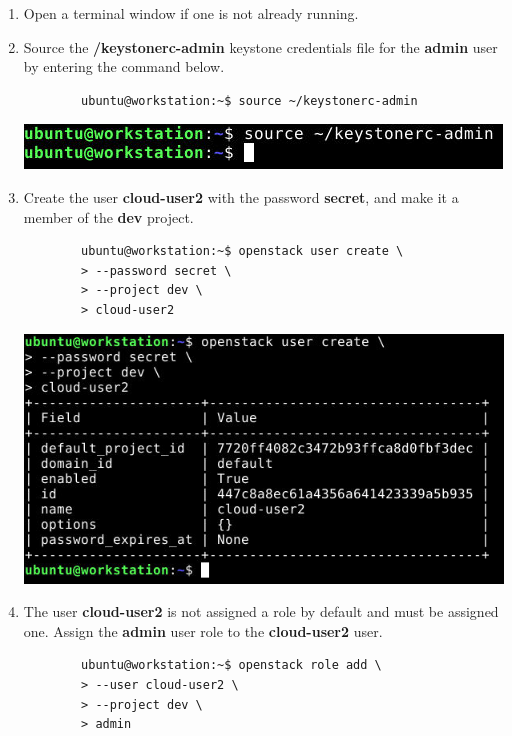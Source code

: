 \documentclass[letterpaper, 12pt]{article}
\begin{document}
\begin{enumerate}
    \item Open a terminal window if one is not already running.
    
    \item Source the \textbf{\texttildemid/keystonerc-admin} keystone credentials file for the
    \textbf{admin} user by entering the command below.
    \begin{lstlisting}
        ubuntu@workstation:~$ source ~/keystonerc-admin
    \end{lstlisting}

    \begin{center}
        \includegraphics[width=\linewidth]{images/part6/step2.png}
    \end{center}

    \item Create the user \textbf{cloud-user2} with the password \textbf{secret}, and make it a member of the
    \textbf{dev} project.
    \begin{lstlisting}
        ubuntu@workstation:~$ openstack user create \
        > --password secret \
        > --project dev \
        > cloud-user2
    \end{lstlisting}

    \begin{center}
        \includegraphics[width=\linewidth]{images/part6/step3.png}
    \end{center}

    \item The user \textbf{cloud-user2} is not assigned a role by default and must be assigned one. Assign the
    \textbf{admin} user role to the \textbf{cloud-user2} user.
    \begin{lstlisting}
        ubuntu@workstation:~$ openstack role add \
        > --user cloud-user2 \
        > --project dev \
        > admin
    \end{lstlisting}


\end{enumerate}
\end{document}
